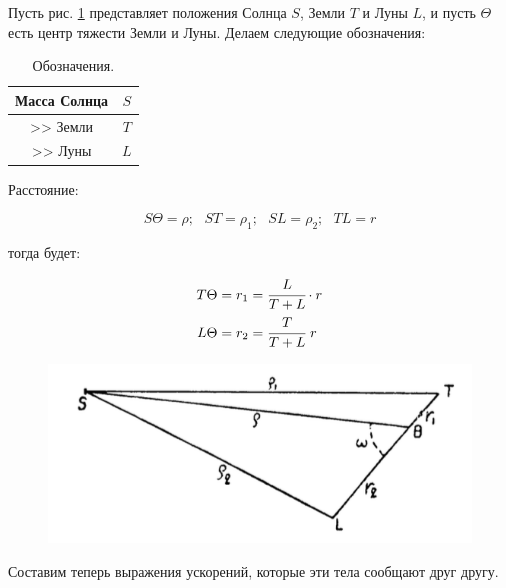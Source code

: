 \documentclass[a4paper,12pt]{article}
\begin{document}

Пусть рис. \ref{1st} представляет положения Солнца $S$, Земли $T$ и Луны $L$, и пусть $\Theta$ есть центр тяжести Земли и Луны. Делаем следующие обозначения:

\begin{table}[h]
	\begin{center}
		\caption{Обозначения.}
		\begin{tabular}{|c|c|}

		\hline 
		Масса Солнца & $S$ \\ 
		\hline 
		>> Земли & $T$ \\ 
		\hline 
		>> Луны & $L$ \\ 
		\hline 
		
		\end{tabular}
	\end{center}
\end{table} 

Расстояние:

\[
	S\Theta = \rho;\text{ } ST = \rho_1;\text{ } SL = \rho_2;\text{ } TL = r
\]

тогда будет:

\begin{equation}\label{eq:eqfirst}
	\begin{aligned}
		T\Theta &= r_1 = \cfrac{L}{T+L} \cdot r \\
		L\Theta &= r_2 = \cfrac{T}{T+L} \text{ } r	
	\end{aligned}
\end{equation}




\begin{figure}
\includegraphics[width=0.9\linewidth]{21}
\caption{}\label{1st}
\end{figure} Составим теперь выражения ускорений, которые эти тела сообщают друг другу.
\end{document}
